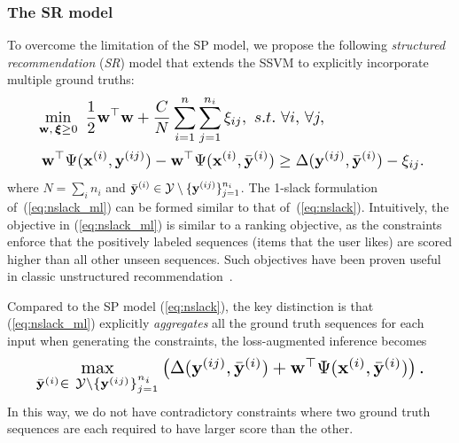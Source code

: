 \subsubsection{The SR model}
To overcome the limitation of the SP model,
we propose the following \emph{structured recommendation} (\emph{SR}) model that extends the SSVM to explicitly incorporate multiple ground truths: %
\begin{equation}
\label{eq:nslack_ml}
\resizebox{0.909\linewidth}{!}{$
\begin{aligned}
& \min_{\w, \, \bm{\xi} \ge 0} \ \frac{1}{2} \w^\top \w + \frac{C}{N} \sum_{i=1}^n \sum_{j=1}^{n_i} \xi_{ij},
\ s.t. \ \forall i, \, \forall j, \\
& \ \w^\top \Psi(\x^{(i)}, \y^{(ij)}) - \w^\top \Psi(\x^{(i)}, \bar{\y}^{(i)}) \ge
  \Delta(\y^{(ij)}, \bar{\y}^{(i)}) - \xi_{ij}.
\end{aligned}
$}
\end{equation}
where $N = \sum_i n_i$ and $\bar{\mathbf{y}}^{(i)} \in \mathcal{Y} \setminus \{\mathbf{y}^{(ij)}\}_{j=1}^{n_i}$.
The 1-slack formulation of~(\ref{eq:nslack_ml}) can be formed similar to that of~(\ref{eq:nslack}).
Intuitively, the objective in (\ref{eq:nslack_ml}) is similar to a ranking objective, as the constraints enforce
that the positively labeled sequences 
(items that the user likes) 
are scored higher than all other unseen sequences.
Such objectives have been proven useful in classic unstructured recommendation~\cite{bpr09}.

Compared to the SP model (\ref{eq:nslack}), the key distinction is that (\ref{eq:nslack_ml})
explicitly \emph{aggregates} all the ground truth sequences for each input when generating the constraints,
\ie the loss-augmented inference becomes
\begin{equation}
\label{eq:loss_aug_inf}
\resizebox{0.909\linewidth}{!}{$
\underset{\bar{\y}^{(i)} \in \ \mathcal{Y} \setminus \{\y^{(ij)}\}_{j=1}^{n_i}}{\max}
     \left( \Delta(\y^{(ij)}, \bar{\y}^{(i)}) + \w^\top \Psi(\x^{(i)}, \bar\y^{(i)}) \right).
$}
\end{equation}
In this way, we do not have contradictory constraints where
two ground truth sequences are each required to have larger score than the other.

